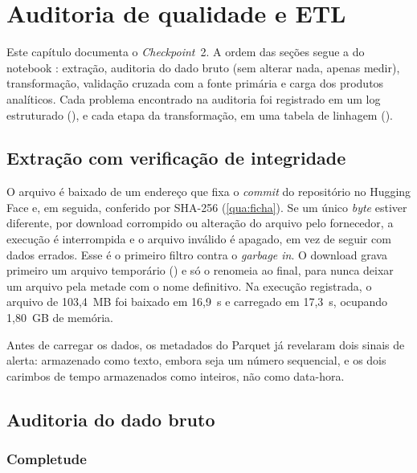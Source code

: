 \chapter{Auditoria de qualidade e ETL}\label{cap:etl}

Este capítulo documenta o \textit{Checkpoint}~2. A ordem das seções segue a do
notebook : extração, auditoria do dado
bruto (sem alterar nada, apenas medir), transformação, validação cruzada com a
fonte primária e carga dos produtos analíticos. Cada problema encontrado na
auditoria foi registrado em um log estruturado (), e cada etapa
da transformação, em uma tabela de linhagem ().

\section{Extração com verificação de integridade}\label{sec:extracao}

O arquivo é baixado de um endereço que fixa o \textit{commit} do repositório no
Hugging Face e, em seguida, conferido por SHA-256 (\autoref{qua:ficha}). Se um
único \textit{byte} estiver diferente, por download corrompido ou alteração do
arquivo pelo fornecedor, a execução é interrompida e o arquivo inválido é
apagado, em vez de seguir com dados errados. Esse é o primeiro filtro contra o
\textit{garbage in}. O download grava primeiro um arquivo temporário
() e só o renomeia ao final, para nunca deixar um arquivo pela
metade com o nome definitivo. Na execução registrada, o arquivo de 103,4~MB foi
baixado em 16,9~s e carregado em 17,3~s, ocupando 1,80~GB de memória.

Antes de carregar os dados, os metadados do Parquet já revelaram dois sinais de
alerta:  armazenado como texto, embora seja um número
sequencial, e os dois carimbos de tempo armazenados como inteiros, não como
data-hora.

\section{Auditoria do dado bruto}\label{sec:auditoria}

\subsection{Completude}\label{sec:completude}

